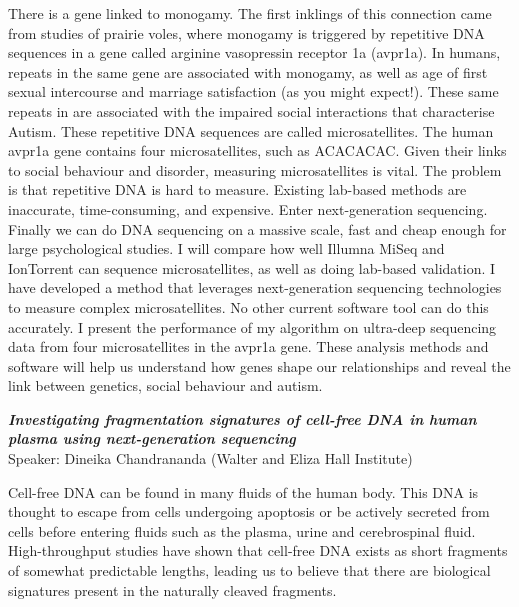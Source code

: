 \documentclass[10pt,]{article}
\begin{document}
\begin{minipage}[c]{\linewidth}
{\small
There is a gene linked to monogamy. The first inklings of this connection came
from studies of prairie voles, where monogamy is triggered by repetitive DNA
sequences in a gene called arginine vasopressin receptor 1a (avpr1a). In
humans, repeats in the same gene are associated with monogamy, as well as age
of first sexual intercourse and marriage satisfaction (as you might expect!).
These same repeats in are associated with the impaired social interactions that
characterise Autism.  These repetitive DNA sequences are called
microsatellites. The human avpr1a gene contains four microsatellites, such as
ACACACAC. Given their links to social behaviour and disorder, measuring
microsatellites is vital. The problem is that repetitive DNA is hard to
measure. Existing lab-based methods are inaccurate, time-consuming, and
expensive.  Enter next-generation sequencing. Finally we can do DNA sequencing
on a massive scale, fast and cheap enough for large psychological studies. I
will compare how well Illumna MiSeq and IonTorrent can sequence
microsatellites, as well as doing lab-based validation.  I have developed a
method that leverages next-generation sequencing technologies to measure
complex microsatellites. No other current software tool can do this accurately.
I present the performance of my algorithm on ultra-deep sequencing data from
four microsatellites in the avpr1a gene.  These analysis methods and software
will help us understand how genes shape our relationships and reveal the link
between genetics, social behaviour and autism.}

\vspace{3ex}

\emph{\bfseries Investigating fragmentation signatures of cell-free DNA in human plasma using next-generation sequencing}\\
Speaker: Dineika Chandrananda (Walter and Eliza Hall Institute)\\[1ex]

{\small
Cell-free DNA can be found in many fluids of the human body. This DNA is
thought to escape from cells undergoing apoptosis or be actively secreted from
cells before entering fluids such as the plasma, urine and cerebrospinal fluid.
High-throughput studies have shown that cell-free DNA exists as short fragments
of somewhat predictable lengths, leading us to believe that there are
biological signatures present in the naturally cleaved fragments.

}
\end{minipage}
\end{document}
